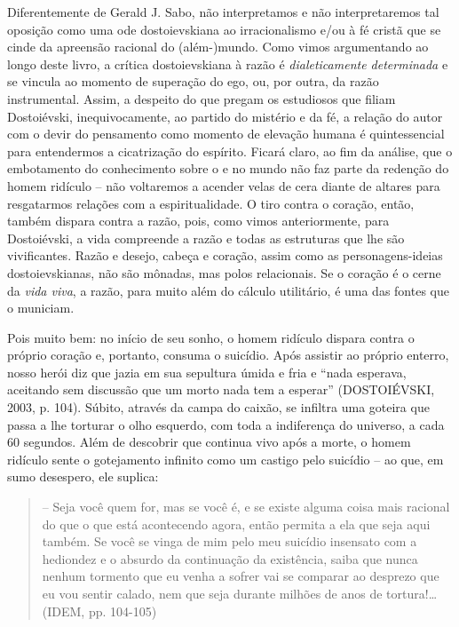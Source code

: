 Diferentemente de Gerald J. Sabo, não interpretamos e não
interpretaremos tal oposição como uma ode dostoievskiana ao
irracionalismo e/ou à fé cristã que se cinde da apreensão racional do
(além-)mundo. Como vimos argumentando ao longo deste livro, a crítica
dostoievskiana à razão é \emph{dialeticamente determinada} e se vincula
ao momento de superação do ego, ou, por outra, da razão instrumental.
Assim, a despeito do que pregam os estudiosos que filiam Dostoiévski,
inequivocamente, ao partido do mistério e da fé, a relação do autor com
o devir do pensamento como momento de elevação humana é quintessencial
para entendermos a cicatrização do espírito. Ficará claro, ao fim da
análise, que o embotamento do conhecimento sobre o e no mundo não faz
parte da redenção do homem ridículo -- não voltaremos a acender velas de
cera diante de altares para resgatarmos relações com a espiritualidade.
O tiro contra o coração, então, também dispara contra a razão, pois,
como vimos anteriormente, para Dostoiévski, a vida compreende a razão e
todas as estruturas que lhe são vivificantes. Razão e desejo, cabeça e
coração, assim como as personagens-ideias dostoievskianas, não são
mônadas, mas polos relacionais. Se o coração é o cerne da \emph{vida
viva}, a razão, para muito além do cálculo utilitário, é uma das fontes
que o municiam.

Pois muito bem: no início de seu sonho, o homem ridículo dispara contra
o próprio coração e, portanto, consuma o suicídio. Após assistir ao
próprio enterro, nosso herói diz que jazia em sua sepultura úmida e fria
e ``nada esperava, aceitando sem discussão que um morto nada tem a
esperar'' (DOSTOIÉVSKI, 2003, p. 104). Súbito, através da campa do
caixão, se infiltra uma goteira que passa a lhe torturar o olho
esquerdo, com toda a indiferença do universo, a cada 60 segundos. Além
de descobrir que continua vivo após a morte, o homem ridículo sente o
gotejamento infinito como um castigo pelo suicídio -- ao que, em sumo
desespero, ele suplica:

\begin{quote}
-- Seja você quem for, mas se você é, e se existe alguma coisa mais
racional do que o que está acontecendo agora, então permita a ela que
seja aqui também. Se você se vinga de mim pelo meu suicídio insensato
com a hediondez e o absurdo da continuação da existência, saiba que
nunca nenhum tormento que eu venha a sofrer vai se comparar ao desprezo
que eu vou sentir calado, nem que seja durante milhões de anos de
tortura!\ldots{} (IDEM, pp. 104-105)
\end{quote}


